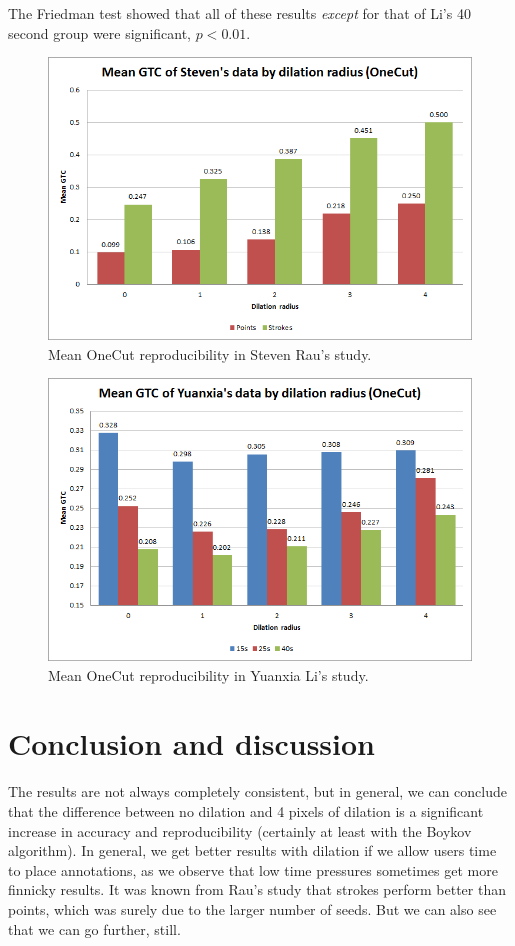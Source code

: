 \documentclass[12pt,a4paper,notitlepage]{article}
\begin{document}
The Friedman test showed that all of these results \textit{except} for that of Li's 40 second group were significant, $p < 0.01$.

\begin{figure}[H]
	\includegraphics[width=.9\linewidth]{steven_onecut_gtc}
	\caption{Mean OneCut reproducibility in Steven Rau's study.}
	\label{fig:steven_onecut_gtc}
\end{figure}

\begin{figure}[H]
	\includegraphics[width=.9\linewidth]{yuanxia_onecut_gtc}
	\caption{Mean OneCut reproducibility in Yuanxia Li's study.}
	\label{fig:yuanxia_onecut_gtc}
\end{figure}

\section{Conclusion and discussion}
The results are not always completely consistent, but in general, we can conclude that the difference between no dilation and 4 pixels of dilation is a significant increase in accuracy and reproducibility (certainly at least with the Boykov algorithm). In general, we get better results with dilation if we allow users time to place annotations, as we observe that low time pressures sometimes get more finnicky results. It was known from Rau's study that strokes perform better than points\cite{rau}, which was surely due to the larger number of seeds. But we can also see that we can go further, still.
\end{document}

